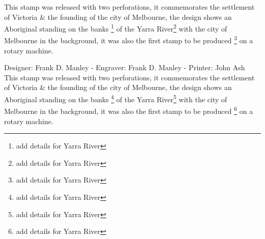 \documentclass[justified]{tufte-book}
\begin{document}


















This stamp was released with two perforations, it commemorates the settlement of 
Victoria \& the founding of the city of Melbourne, the design shows an Aboriginal standing on the banks \footnote{add details for Yarra River}
of the Yarra River\footnote{add details for Yarra River} with the city of Melbourne in the background, it was also the first stamp to be produced \footnote{add details for Yarra River}
on a rotary machine.



Designer: Frank D. Manley - Engraver: Frank D. Manley - Printer: John Ash\\

This stamp was released with two perforations, it commemorates the settlement of 
Victoria \& the founding of the city of Melbourne, the design shows an Aboriginal standing on the banks \footnote{add details for Yarra River}
of the Yarra River\footnote{add details for Yarra River} with the city of Melbourne in the background, it was also the first stamp to be produced \footnote{add details for Yarra River}
on a rotary machine.
\end{document}
